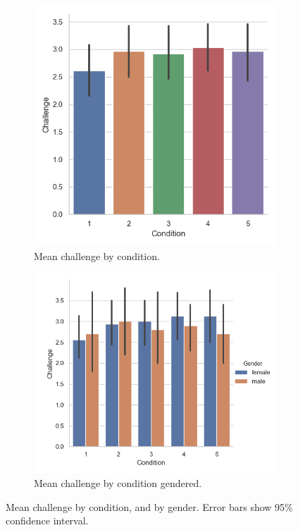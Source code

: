 \begin{figure}[H]
 \begin{subfigure}[b]{0.5\textwidth}
     \centering
     \includegraphics[scale=0.5]{Files/Plots/challenge_by_condition_mean.png}
     \caption{Mean challenge by condition.}
     \label{fig:meanChal}
 \end{subfigure}
  \begin{subfigure}[b]{0.5\textwidth}
     \centering
     \includegraphics[scale=0.5]{Files/Plots/challenge_by_condition_mean_gen.png}
     \caption{Mean challenge by condition gendered.}
     \label{fig:meanChalGen}
 \end{subfigure}
     \caption{Mean challenge by condition, and by gender. Error bars show 95\%  confidence interval.}
    \label{fig:chalByCond}
\end{figure}
